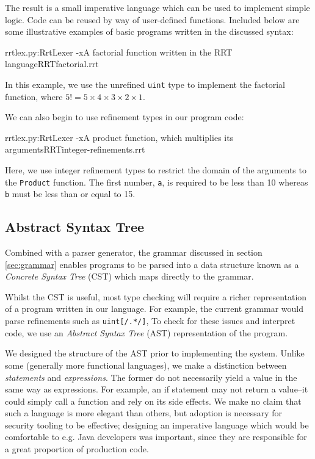 \documentclass[a4paper,openany,12pt]{book}
\begin{document}
The result is a small imperative language which can be used to implement simple logic.
Code can be reused by way of user-defined functions.
Included below are some illustrative examples of basic programs written in the discussed syntax:

\begin{mycodefile}{rrtlex.py:RrtLexer -x}{\label{code:rrt:1}A factorial function written in the RRT language}{RRT}{factorial.rrt}
    \vspace{0.5em}

    In this example, we use the unrefined \texttt{uint} type to implement the factorial function, where
    $5! = 5\times 4 \times 3 \times 2 \times 1$.
\end{mycodefile}

We can also begin to use refinement types in our program code:

\begin{mycodefile}{rrtlex.py:RrtLexer -x}{\label{code:rrt:2}A product function, which multiplies its arguments}{RRT}{integer-refinements.rrt}
    \vspace{0.5em}

    Here, we use integer refinement types to restrict the domain of the arguments to the \texttt{Product}
    function.
    The first number, \texttt{a}, is required to be less than 10 whereas \texttt{b} must be less than or equal to 15.
\end{mycodefile}

\label{sec:grammar}

\subsection{Abstract Syntax Tree}

Combined with a parser generator, the grammar discussed in section \ref{sec:grammar} enables programs to be parsed into
a data structure known as a \emph{Concrete Syntax Tree} (CST) which maps directly to the grammar.

Whilst the CST is useful, most type checking will require a richer representation of a program written in our language.
For example, the current grammar would parse refinements such as \textcolor{id7-ruby-red}{\texttt{uint}}\texttt{[/.*/]},
To check for these issues and interpret code, we use an \emph{Abstract Syntax Tree} (AST) representation of the program.

We designed the structure of the AST prior to implementing the system.
Unlike some (generally more functional languages), we make a distinction between \textit{statements} and
\textit{expressions}.
The former do not necessarily yield a value in the same way as expressions.
For example, an if statement may not return a value--it could simply call a function and rely on its side effects.
We make no claim that such a language is more elegant than others, but adoption is necessary for security tooling
to be effective; designing an imperative language which would be comfortable to e.g. Java developers was important,
since they are responsible for a great proportion of production code.
\end{document}
